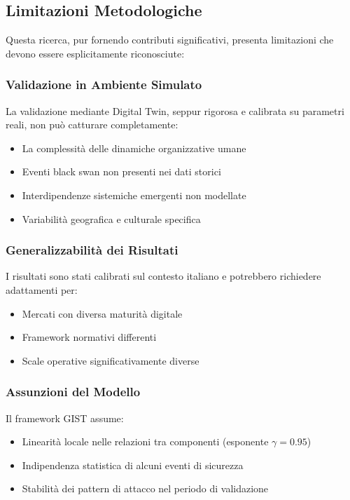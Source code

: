 \subsection{Limitazioni Metodologiche}

Questa ricerca, pur fornendo contributi significativi, presenta limitazioni che devono essere esplicitamente riconosciute:

\subsubsection{Validazione in Ambiente Simulato}
La validazione mediante Digital Twin, seppur rigorosa e calibrata su parametri reali, non può catturare completamente:
\begin{itemize}
\item La complessità delle dinamiche organizzative umane
\item Eventi black swan non presenti nei dati storici
\item Interdipendenze sistemiche emergenti non modellate
\item Variabilità geografica e culturale specifica
\end{itemize}

\subsubsection{Generalizzabilità dei Risultati}
I risultati sono stati calibrati sul contesto italiano e potrebbero richiedere adattamenti per:
\begin{itemize}
\item Mercati con diversa maturità digitale
\item Framework normativi differenti
\item Scale operative significativamente diverse
\end{itemize}

\subsubsection{Assunzioni del Modello}
Il framework GIST assume:
\begin{itemize}
\item Linearità locale nelle relazioni tra componenti (esponente $\gamma = 0.95$)
\item Indipendenza statistica di alcuni eventi di sicurezza
\item Stabilità dei pattern di attacco nel periodo di validazione
\end{itemize}

